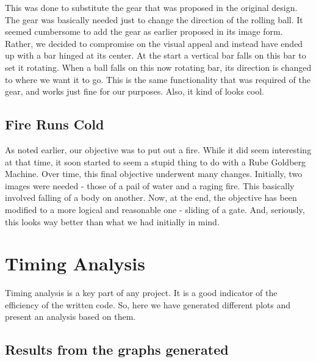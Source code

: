 \documentclass[a4paper,11pt]{article}
\begin{document}
This was done to substitute the gear that was proposed in the original design. The gear was basically needed just to change the direction of the rolling ball. It seemed cumbersome to add the gear as earlier proposed in its image form. Rather, we decided to compromise on the visual appeal and instead have ended up with a bar hinged at its center. At the start a vertical bar falls on this bar to set it rotating.  When a ball falls on this now rotating bar, its direction is changed to where we want it to go. This is the same functionality that was required of the gear, and works just fine for our purposes. Also, it kind of looks cool.

\subsection{Fire Runs Cold}

As noted earlier, our objective was to put out a fire. While it did seem interesting at that time, it soon started to seem a stupid thing to do with a Rube Goldberg Machine. Over time, this final objective underwent many changes. Initially, two images were needed - those of a pail of water and a raging fire. This basically involved falling of a body on another. Now, at the end, the objective has been modified to a more logical and reasonable one - sliding of a gate. And, seriously, this looks way better than what we had initially in mind.

\section{Timing Analysis}

Timing analysis is a key part of any project. It is a good indicator of the efficiency of the written code. So, here we have generated 
different plots and present an analysis based on them.

\subsection{Results from the graphs generated}
\end{document}
